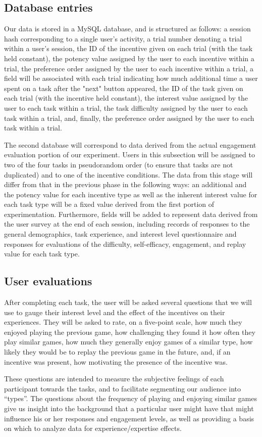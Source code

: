 \subsection{Database entries}
Our data is stored in a MySQL database, and is structured as follows: a session hash corresponding to a single user's activity, a trial number denoting a trial within a user's session, the ID of the incentive given on each trial (with the task held constant), the potency value assigned by the user to each incentive within a trial, the preference order assigned by the user to each incentive within a trial, a field will be associated with each trial indicating how much additional time a user spent on a task after the "next" button appeared, the ID of the task given on each trial (with the incentive held constant), the interest value assigned by the user to each task within a trial, the task difficulty assigned by the user to each task within a trial, and, finally, the preference order assigned by the user to each task within a trial.

The second database will correspond to data derived from the actual engagement evaluation portion of our experiment. Users in this subsection will be assigned to two of the four tasks in pseudorandom order (to ensure that tasks are not duplicated) and to one of the incentive conditions. The data from this stage will differ from that in the previous phase in the following ways: an additional and the potency value for each incentive type as well as the inherent interest value for each task type will be a fixed value derived from the first portion of experimentation. Furthermore, fields will be added to represent data derived from the user survey at the end of each session, including records of responses to the general demographics, task experience, and interest level questionnaire and responses for evaluations of the difficulty, self-efficacy, engagement, and replay value for each task type.

\subsection{User evaluations}
After completing each task, the user will be asked several questions that we will use to gauge their interest level and the effect of the incentives on their experiences. They will be asked to rate, on a five-point scale, how much they enjoyed playing the previous game, how challenging they found it how often they play similar games, how much they generally enjoy games of a similar type, how likely they would be to replay the previous game in the future, and, if an incentive was present, how motivating the presence of the incentive was.

These questions are intended to measure the subjective feelings of each participant towards the tasks, and to facilitate segmenting our audience into “types”. The questions about the frequency of playing and enjoying similar games give us insight into the background that a particular user might have that might influence his or her responses and engagement levels, as well as providing a basis on which to analyze data for experience/expertise effects. 

